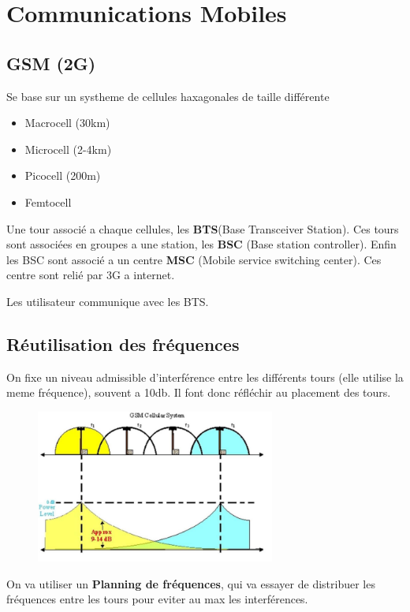 			
\section{Communications Mobiles}
	\subsection{GSM (2G)}
		Se base sur un systheme de cellules haxagonales de taille différente
		\begin{itemize}
			\item Macrocell (30km)
			\item Microcell (2-4km)
			\item Picocell (200m)
			\item Femtocell
		\end{itemize}
		
		Une tour associé a chaque cellules, les \textbf{BTS}(Base Transceiver Station). Ces tours sont associées en groupes a une station, les \textbf{BSC} (Base station controller). Enfin les BSC sont associé a un centre \textbf{MSC} (Mobile service switching center). Ces centre sont relié par 3G a internet.
		
		Les utilisateur communique avec les BTS.
		
	\subsection{Réutilisation des fréquences}
			On fixe un niveau admissible d'interférence entre les différents tours (elle utilise la meme fréquence), souvent a 10db. Il font donc réfléchir au placement des tours.
			\begin{figure}[H]
				\centering
				\includegraphics[width=0.7\textwidth]{img/CM/RF.png}
			\end{figure}
			
			On va utiliser un \textbf{Planning de fréquences}, qui va essayer de distribuer les fréquences entre les tours pour eviter au max les interférences.
 
